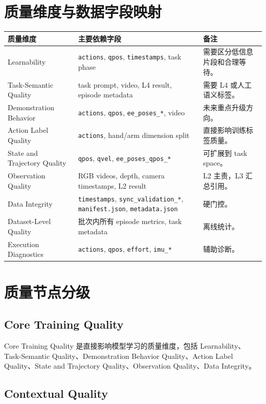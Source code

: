 \documentclass[UTF8,zihao=-4,oneside,openany]{ctexrep}
\newcommand{\Code}[1]{\texttt{#1}}
\begin{document}
\section{质量维度与数据字段映射}

\begin{longtable}{L{3.4cm} L{6.1cm} L{4.5cm}}
\toprule
质量维度 & 主要依赖字段 & 备注 \\
\midrule
Learnability & \Code{actions}, \Code{qpos}, \Code{timestamps}, task phase & 需要区分低信息片段和合理等待。 \\
Task-Semantic Quality & task prompt, video, L4 result, episode metadata & 需要 L4 或人工语义标签。 \\
Demonstration Behavior & \Code{actions}, \Code{qpos}, \Code{ee\_poses\_*}, video & 未来重点升级方向。 \\
Action Label Quality & \Code{actions}, hand/arm dimension split & 直接影响训练标签质量。 \\
State and Trajectory Quality & \Code{qpos}, \Code{qvel}, \Code{ee\_poses\_qpos\_*} & 可扩展到 task space。 \\
Observation Quality & RGB videos, depth, camera timestamps, L2 result & L2 主责，L3 汇总引用。 \\
Data Integrity & \Code{timestamps}, \Code{sync\_validation\_*}, \Code{manifest.json}, \Code{metadata.json} & 硬门控。 \\
Dataset-Level Quality & 批次内所有 episode metrics, task metadata & 离线统计。 \\
Execution Diagnostics & \Code{actions}, \Code{qpos}, \Code{effort}, \Code{imu\_*} & 辅助诊断。 \\
\bottomrule
\end{longtable}

\section{质量节点分级}

\subsection{Core Training Quality}

Core Training Quality 是直接影响模型学习的质量维度，包括 Learnability、Task-Semantic Quality、Demonstration Behavior Quality、Action Label Quality、State and Trajectory Quality、Observation Quality、Data Integrity。

\subsection{Contextual Quality}
\end{document}
